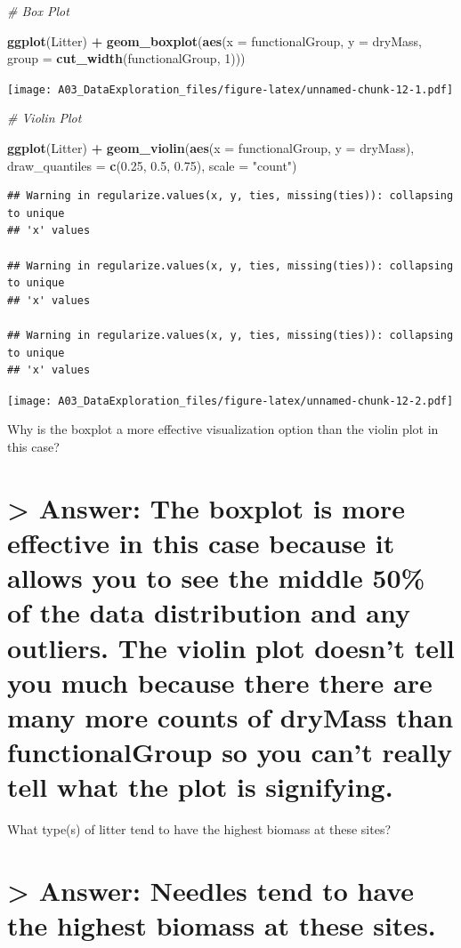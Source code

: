 \documentclass[]{article}
\newenvironment{Shaded}{\begin{snugshade}}{\end{snugshade}}
\newcommand{\KeywordTok}[1]{\textcolor[rgb]{0.13,0.29,0.53}{\textbf{#1}}}
\newcommand{\DataTypeTok}[1]{\textcolor[rgb]{0.13,0.29,0.53}{#1}}
\newcommand{\DecValTok}[1]{\textcolor[rgb]{0.00,0.00,0.81}{#1}}
\newcommand{\FloatTok}[1]{\textcolor[rgb]{0.00,0.00,0.81}{#1}}
\newcommand{\StringTok}[1]{\textcolor[rgb]{0.31,0.60,0.02}{#1}}
\newcommand{\CommentTok}[1]{\textcolor[rgb]{0.56,0.35,0.01}{\textit{#1}}}
\newcommand{\OperatorTok}[1]{\textcolor[rgb]{0.81,0.36,0.00}{\textbf{#1}}}
\newcommand{\NormalTok}[1]{#1}
\begin{document}
\begin{Shaded}
\begin{Highlighting}[]
\CommentTok{# Box Plot}

\KeywordTok{ggplot}\NormalTok{(Litter) }\OperatorTok{+}
\StringTok{  }\KeywordTok{geom_boxplot}\NormalTok{(}\KeywordTok{aes}\NormalTok{(}\DataTypeTok{x =}\NormalTok{ functionalGroup, }\DataTypeTok{y =}\NormalTok{ dryMass, }\DataTypeTok{group =} \KeywordTok{cut_width}\NormalTok{(functionalGroup, }\DecValTok{1}\NormalTok{)))}
\end{Highlighting}
\end{Shaded}

\texttt{[image: A03\_DataExploration\_files/figure-latex/unnamed-chunk-12-1.pdf]}

\begin{Shaded}
\begin{Highlighting}[]
\CommentTok{# Violin Plot}

\KeywordTok{ggplot}\NormalTok{(Litter) }\OperatorTok{+}
\StringTok{  }\KeywordTok{geom_violin}\NormalTok{(}\KeywordTok{aes}\NormalTok{(}\DataTypeTok{x =}\NormalTok{ functionalGroup, }\DataTypeTok{y =}\NormalTok{ dryMass),}
              \DataTypeTok{draw_quantiles =} \KeywordTok{c}\NormalTok{(}\FloatTok{0.25}\NormalTok{, }\FloatTok{0.5}\NormalTok{, }\FloatTok{0.75}\NormalTok{), }
              \DataTypeTok{scale =} \StringTok{"count"}\NormalTok{)}
\end{Highlighting}
\end{Shaded}

\begin{verbatim}
## Warning in regularize.values(x, y, ties, missing(ties)): collapsing to unique
## 'x' values

## Warning in regularize.values(x, y, ties, missing(ties)): collapsing to unique
## 'x' values

## Warning in regularize.values(x, y, ties, missing(ties)): collapsing to unique
## 'x' values
\end{verbatim}

\texttt{[image: A03\_DataExploration\_files/figure-latex/unnamed-chunk-12-2.pdf]}

Why is the boxplot a more effective visualization option than the violin
plot in this case?

\section{\textgreater{} Answer: The boxplot is more effective in this
case because it allows you to see the middle 50\% of the data
distribution and any outliers. The violin plot doesn't tell you much
because there there are many more counts of dryMass than functionalGroup
so you can't really tell what the plot is
signifying.}\label{answer-the-boxplot-is-more-effective-in-this-case-because-it-allows-you-to-see-the-middle-50-of-the-data-distribution-and-any-outliers.-the-violin-plot-doesnt-tell-you-much-because-there-there-are-many-more-counts-of-drymass-than-functionalgroup-so-you-cant-really-tell-what-the-plot-is-signifying.}

What type(s) of litter tend to have the highest biomass at these sites?

\section{\textgreater{} Answer: Needles tend to have the highest biomass
at these
sites.}\label{answer-needles-tend-to-have-the-highest-biomass-at-these-sites.}
\end{document}
